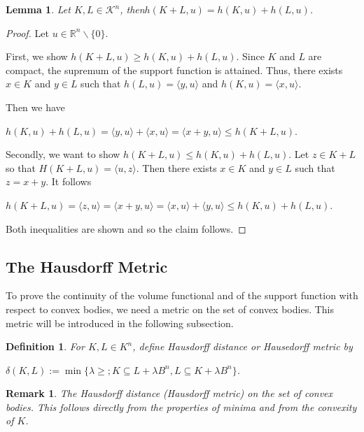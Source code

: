 \documentclass[a4paper]{book}
\newtheorem{lemma}[theorem]{Lemma}%
\newtheorem{remark}[theorem]{Remark}%
\newtheorem{definition}[theorem]{Definition}%
\numberwithin{theorem}{section}%
\begin{document}
\begin{lemma}
    Let $K,L\in\mathscr{K}^{n}$, then$h(K+L,u)=h(K,u)+h(L,u)$.
\end{lemma}
\begin{proof}
    Let $u\in\mathbb{R}^{n}\backslash\{0\}$.

    First, we show $h(K+L,u)\geq h(K,u)+h(L,u)$. Since $K$ and $L$ are compact, the supremum of the support function is attained. Thus, there exists $x\in K$ and $y\in L$ such that $h(L,u)=\langle y,u\rangle$ and $h(K,u)=\langle x,u\rangle$.

    Then we have
    \begin{center}
        $h(K,u)+h(L,u)=\langle y,u\rangle+\langle x,u\rangle=\langle x+y,u\rangle\leq h(K+L,u)$.
    \end{center}

    Secondly, we want to show $h(K+L,u)\leq h(K,u)+h(L,u)$. Let $z\in K+L$ so that $H(K+L,u)=\langle u,z\rangle$. Then there exists $x\in K$ and $y\in L$ such that $z=x+y$. It follows
    \begin{center}
        $h(K+L,u)=\langle z,u\rangle=\langle x+y,u\rangle=\langle x,u\rangle+\langle y,u\rangle\leq h(K,u)+h(L,u)$.
    \end{center}
    Both inequalities are shown and so the claim follows.
\end{proof}

\subsection{The Hausdorff Metric}
To prove the continuity of the volume functional and of the support function with respect to convex bodies, we need a metric on the set of convex bodies. This metric will be introduced in the following subsection.~\citep{gehring2019isoperimetric}

\begin{definition}
    For $K,L\in K^{n}$, define Hausdorff distance or Hausedorff metric by
    \begin{center}
        $\delta(K,L):=\min\{\lambda\geq;K\subseteq L+\lambda B^{n},L\subseteq K+\lambda B^{n}\}$.
    \end{center}
\end{definition}

\begin{remark}
    The Hausdorff distance (Hausdorff metric) on the set of convex bodies. This follows directly from the properties of minima and from the convexity of $K$.
\end{remark}
\end{document}
